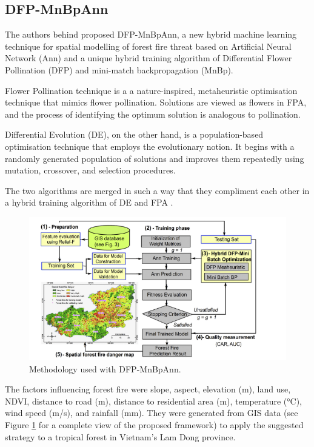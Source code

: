 \subsection{DFP-MnBpAnn}
The authors behind \cite{TIENBUI2018104} proposed DFP-MnBpAnn, a new hybrid machine learning technique for spatial modelling of forest fire threat based on Artificial Neural Network (Ann) and a unique hybrid training algorithm of Differential Flower Pollination (DFP) and mini-match backpropagation (MnBp). 


Flower Pollination technique is a a nature-inspired, metaheuristic optimisation technique that mimics flower pollination. Solutions are viewed as flowers in FPA, and the process of identifying the optimum solution is analogous to pollination. 


Differential Evolution (DE), on the other hand, is a population-based optimisation technique that employs the evolutionary notion. It begins with a randomly generated population of solutions and improves them repeatedly using mutation, crossover, and selection procedures. 


The two algorithms are merged in such a way that they compliment each other in a hybrid training algorithm of DE and FPA \cite{Abdel-Basset2019}. 

\begin{figure}[h!]
 \centering
  \includegraphics[width=1\linewidth]{frontmatter/imgs/hybrid_methodology.PNG}
  \caption{Methodology used with DFP-MnBpAnn\cite{LIN2018101}.}
  \label{fig:hybrid:dfpann}
\end{figure}

The factors influencing forest fire were slope, aspect, elevation (m), land use, NDVI, distance to road (m), distance to residential area (m), temperature (°C), wind speed (m/s), and rainfall (mm). They were generated from GIS data (see Figure \ref{fig:hybrid:dfpann} for a complete view of the proposed framework) to apply the suggested strategy to a tropical forest in Vietnam's Lam Dong province. 


